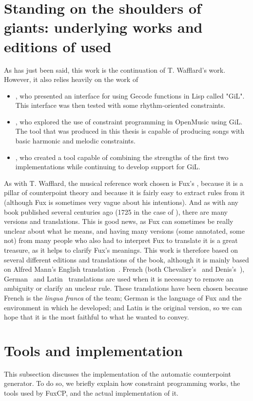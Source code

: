\section{Standing on the shoulders of giants: underlying works and editions of \gaps used}
As has just been said, this work is the continuation of T. Wafflard's work. However, it also relies heavily on the work of
\begin{itemize}
    \item \textcite{GiLthesis}, who presented an interface for using Gecode functions in Lisp called "GiL". This interface was then tested with some rhythm-oriented constraints.
    \item \textcite{Melothesis}, who explored the use of constraint programming in OpenMusic using GiL. The tool that was produced in this thesis is capable of producing songs with basic harmonic and melodic constraints.
    \item \textcite{Melo2thesis}, who created a tool capable of combining the strengths of the first two implementations while continuing to develop support for GiL.
\end{itemize}

As with T. Wafflard, the musical reference work chosen is Fux's \gap, because it is a pillar of counterpoint theory and because it is fairly easy to extract rules from it (although Fux is sometimes very vague about his intentions). And as with any book published several centuries ago (1725 in the case of \gap), there are many versions and translations. This is good news, as Fux can sometimes be really unclear about what he means, and having many versions (some annotated, some not) from many people who also had to interpret Fux to translate it is a great treasure, as it helps to clarify Fux's meanings. This work is therefore based on several different editions and translations of the book, although it is mainly based on Alfred Mann's English translation~\cite{GaPEng}. French (both Chevalier's~\cite{GaPFrChevalier} and Denis's~\cite{GaPFrDenis}), German~\cite{GaPDe} and Latin~\cite{GapLa} translations are used when it is necessary to remove an ambiguity or clarify an unclear rule. These translations have been chosen because French is the \textit{lingua franca} of the team; German is the language of Fux and the environment in which he developed; and Latin is the original version, so we can hope that it is the most faithful to what he wanted to convey.

\section{Tools and implementation}\label{subsection:tools-and-implementation}
This subsection discusses the implementation of the automatic counterpoint generator. To do so, we briefly explain how constraint programming works, the tools used by FuxCP, and the actual implementation of it.

